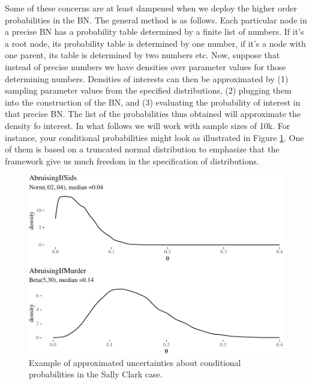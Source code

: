 \documentclass[
  10pt,
  dvipsnames,enabledeprecatedfontcommands]{scrartcl}
\begin{document}
Some of these concerns are at least dampened when we deploy the higher
order probabilities in the BN. The general method is as follows. Each
particular node in a precise BN has a probability table determined by a
finite list of numbers. If it's a root node, its probability table is
determined by one number, if it's a node with one parent, its table is
determined by two numbers etc. Now, suppose that instead of precise
numbers we have densities over parameter values for those determining
numbers. Densities of interests can then be approximated by (1) sampling
parameter values from the specified distributions, (2) plugging them
into the construction of the BN, and (3) evaluating the probability of
interest in that precise BN. The list of the probabilities thus obtained
will approximate the density fo interest. In what follows we will work
with sample sizes of 10k. For instance, your conditional probabilities
might look as illustrated in Figure \ref{fig:SCwithHOPa}. One of them is
based on a truncated normal distribution to emphasize that the framework
give us much freedom in the specification of distributions.

\begin{figure}[H]

\begin{center}\includegraphics[width=0.9\linewidth]{chapter-outline_files/figure-latex/fig:SCwithHOPa-1} \end{center}
\caption{Example of approximated uncertainties about conditional probabilities in the Sally Clark case.}
\label{fig:SCwithHOPa}
\end{figure}
\end{document}

